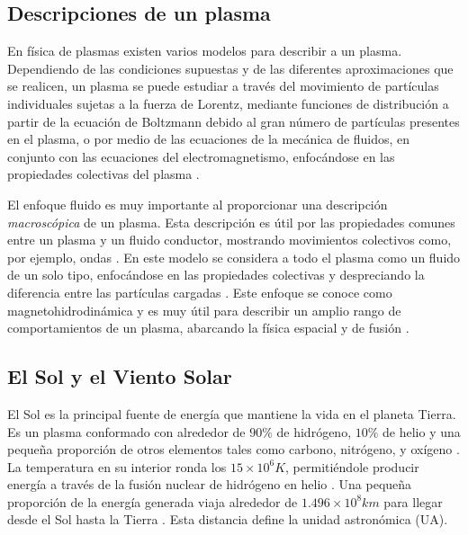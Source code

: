 \subsection{Descripciones de un plasma}

\noindent En física de plasmas existen varios modelos para describir a un plasma. Dependiendo de las condiciones supuestas y de las diferentes aproximaciones que se realicen, un plasma se puede estudiar a través del movimiento de partículas individuales sujetas a la fuerza de Lorentz, mediante funciones de distribución a partir de la ecuación de Boltzmann debido al gran número de partículas presentes en el plasma, o por medio de las ecuaciones de la mecánica de fluidos, en conjunto con las ecuaciones del electromagnetismo, enfocándose en las propiedades colectivas del plasma \cite{Umran, Chen, Krall}.   

El enfoque fluido es muy importante al proporcionar una descripción \textit{macroscópica} de un plasma. Esta descripción es útil por las propiedades comunes entre un plasma y un fluido conductor, mostrando movimientos colectivos como, por ejemplo, ondas \cite{Krall}. En este modelo se considera a todo el plasma como un fluido de un solo tipo, enfocándose en las propiedades colectivas y despreciando la diferencia entre las partículas cargadas \cite{Umran, Chen}. Este enfoque se conoce como magnetohidrodinámica y es muy útil para describir un amplio rango de comportamientos de un plasma, abarcando la física espacial y de fusión \cite{Umran}. 

\subsection{El Sol y el Viento Solar}

\noindent El Sol es la principal fuente de energía que mantiene la vida en el planeta Tierra.  Es un plasma conformado con alrededor de $90\%$ de hidrógeno, $10\%$ de helio y una pequeña proporción de otros elementos tales como carbono, nitrógeno, y oxígeno \cite{Parks}. La temperatura en su interior ronda los $15 \times 10^{6} K$, permitiéndole producir energía a través de la fusión nuclear de hidrógeno en helio \cite{Cravens}. Una pequeña proporción de la energía generada viaja alrededor de $1.496 \times 10^{8} km$ para llegar desde el Sol hasta la Tierra \cite{Kamide}. Esta distancia define la unidad astronómica (UA).

